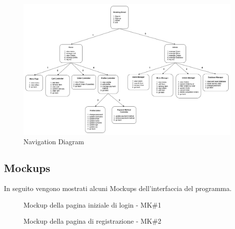 \documentclass{article}
\begin{document}
\begin{figure}[H]
    \centering
    \hspace*{-2.5cm}
    \includegraphics[width=1.4\textwidth]{imgs/NavigationDiagram.png}%
    \caption{Navigation Diagram}
    \label{navigationDiagram}
\end{figure}

\newpage

\subsection{Mockups}
In seguito vengono mostrati alcuni Mockups dell'interfaccia del programma.

\setlength{\fboxsep}{0pt}
            \begin{figure}[H]
                \centering
                \caption{Mockup della pagina iniziale di login - MK\#1}
                \label{fig:mk.1}
            \end{figure}
            
\setlength{\fboxsep}{0pt}
            \begin{figure}[H]
                \centering
                \caption{Mockup della pagina di registrazione - MK\#2}
                \label{fig:mk.2}
            \end{figure}
\end{document}

